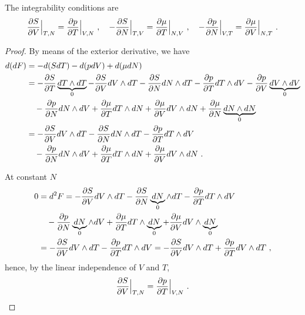     The integrability conditions are 
    \begin{equation}\label{td:int:f}
        \frac{\partial S}{\partial V} \Big \vert_{T,N} = \frac{\partial p}{\partial T} \Big \vert_{V,N} ~, \quad 
        - \frac{\partial S}{\partial N} \Big \vert_{T,V} = \frac{\partial\mu}{\partial T} \Big \vert_{N, V} ~, \quad 
        - \frac{\partial p}{\partial N} \Big \vert_{V,T} = \frac{\partial\mu}{\partial V} \Big \vert_{N, T} ~. 
    \end{equation}
    \begin{proof}
        By means of the exterior derivative, we have 
        \begin{equation*}
        \begin{aligned}
            d (dF) & = - d (S dT) - d (p dV) + d (\mu dN) \\ & = - \frac{\partial S}{\partial T} \underbrace{dT \wedge dT}_0 - \frac{\partial S}{\partial V} dV \wedge dT - \frac{\partial S}{\partial N} dN \wedge dT - \frac{\partial p}{\partial T} dT \wedge dV - \frac{\partial p}{\partial V} \underbrace{dV \wedge dV}_0 \\ & \quad - \frac{\partial p}{\partial N} dN \wedge dV + \frac{\partial\mu}{\partial T} dT \wedge dN + \frac{\partial\mu}{\partial V} dV \wedge dN + \frac{\partial\mu}{\partial N} \underbrace{dN \wedge dN}_0 \\ & = - \frac{\partial S}{\partial V} dV \wedge dT - \frac{\partial S}{\partial N} dN \wedge dT - \frac{\partial p}{\partial T} dT \wedge dV \\ & \quad - \frac{\partial p}{\partial N} dN \wedge dV + \frac{\partial\mu}{\partial T} dT \wedge dN + \frac{\partial\mu}{\partial V} dV \wedge dN ~.
        \end{aligned}
        \end{equation*}

        At constant $N$ 
        \begin{equation*}
        \begin{aligned}
            0 & = d^2 F = - \frac{\partial S}{\partial V} dV \wedge dT - \frac{\partial S}{\partial N} \underbrace{dN}_0 \wedge dT - \frac{\partial p}{\partial T} dT \wedge dV \\ & \quad - \frac{\partial p}{\partial N} \underbrace{dN}_0 \wedge dV + \frac{\partial\mu}{\partial T} dT \wedge \underbrace{dN}_0 + \frac{\partial\mu}{\partial V} dV \wedge \underbrace{dN}_0 \\ & = - \frac{\partial S}{\partial V} dV \wedge dT - \frac{\partial p}{\partial T} dT \wedge dV = - \frac{\partial S}{\partial V} dV \wedge dT + \frac{\partial p}{\partial T} dV \wedge dT  ~,
        \end{aligned}
        \end{equation*}
        hence, by the linear independence of $V$ and $T$,
        \begin{equation*}
            \frac{\partial S}{\partial V} \Big \vert_{T,N} = \frac{\partial p}{\partial T} \Big \vert_{V,N} ~.
        \end{equation*}


\end{proof}
